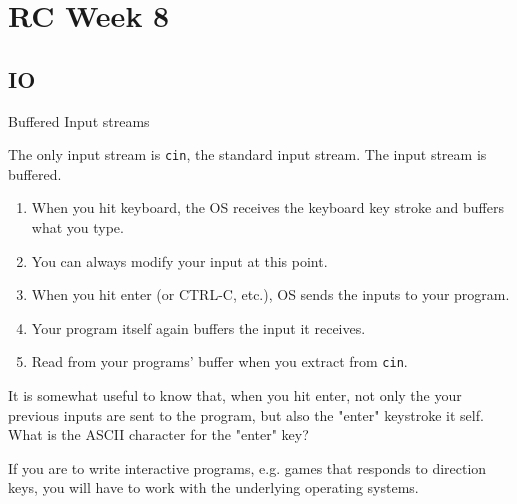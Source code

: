 \section{RC Week 8}

\subsection{IO}
\begin{frame}[fragile]{Buffered Input streams}

The only input stream is \texttt{cin}, the standard input stream. The input stream is buffered.

\begin{enumerate}
	\item When you hit keyboard, the OS receives the keyboard key stroke and buffers what you type. \item You can always modify your input at this point.
	\item When you hit enter (or CTRL-C, etc.), OS sends the inputs to your program.
	\item Your program itself again buffers the input it receives.
	\item Read from your programs' buffer when you extract from \texttt{cin}.
\end{enumerate}	


It is somewhat useful to know that, when you hit enter, not only the your previous inputs are sent to the program, but also the "enter" keystroke it self. What is the ASCII character for the "enter" key?

If you are to write interactive programs, e.g. games that responds to direction keys, you will have to work with the underlying operating systems. 

\end{frame}

